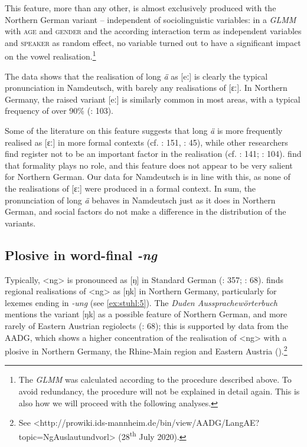 \documentclass[output=paper]{langsci/langscibook}
\begin{document}
This feature, more than any other, is almost exclusively produced with the Northern German variant -- independent of sociolinguistic variables: in a \textit{GLMM} with \textsc{age} and \textsc{gender} and the according interaction term as independent variables and \textsc{speaker} as random effect, no variable turned out to have a significant impact on the vowel realisation.\footnote{The \textit{GLMM} was calculated according to the procedure described above. To avoid redundancy, the procedure will not be explained in detail again. This is also how we will proceed with the following analyses.} 

The data shows that the realisation of long \textit{ä} as [eː] is clearly the typical pronunciation in Namdeutsch, with barely any realisations of [ɛː]. In Northern Germany, the raised variant [eː] is similarly common in most areas, with a typical frequency of over 90\% (\citealt{elmentaler_norddeutscher_2015}: 103). 

Some of the literature on this feature suggests that long \textit{ä} is more frequently realised as [ɛː] in more formal contexts (cf. \citealt{stearns_contemporary_1979}: 151, \citealt{konig_atlas_2019a}: 45), while other researchers find register not to be an important factor in the realisation (cf. \citealt{herrmann-winter_studien_1979}: 141; \citealt{elmentaler_norddeutscher_2015}: 104). \citet[106]{elmentaler_norddeutscher_2015} find that formality plays no role, and this feature does not appear to be very salient for Northern German. Our data for Namdeutsch is in line with this, as none of the realisations of [ɛː] were produced in a formal context. In sum, the pronunciation of long \textit{ä} behaves in Namdeutsch just as it does in Northern German, and social factors do not make a difference in the distribution of the variants.

\subsection{Plosive in word-final \textit{-ng}}
\label{sec:stuhl:4.3}

Typically, <ng> is pronounced as [ŋ] in Standard German (\citealt{elmentaler_norddeutscher_2015}: 357; \citealt{kleiner_duden_2015}: 68). \citet[233]{konig_atlas_2019b} finds regional realisations of <ng> as [ŋk] in Northern Germany, particularly for lexemes ending in \textit{-ung} (see \ref{ex:stuhl:5}). The \textit{Duden Aussprachewörterbuch} mentions the variant [ŋk] as a possible feature of Northern German, and more rarely of Eastern Austrian regiolects (\citealt{kleiner_duden_2015}: 68); this is supported by data from the AADG, which shows a higher concentration of the realisation of <ng> with a plosive in Northern Germany, the Rhine-Main region and Eastern Austria (\citealt{kleiner_atlas_2011}).\footnote{See <http://prowiki.ids\nobreakdash-mannheim.de/bin/view/AADG/LangAE?topic=NgAuslautundvorl> (28\textsuperscript{th} July 2020).}
\end{document}
